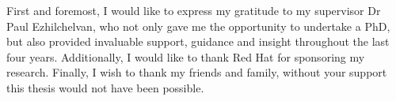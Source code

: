 
\begin{acknowledgements}      
First and foremost, I would like to express my gratitude to my supervisor Dr Paul Ezhilchelvan, who not only gave me the opportunity to undertake a PhD, but also provided invaluable support, guidance and insight throughout the last four years.  Additionally, I would like to thank Red Hat for sponsoring my research.  Finally, I wish to thank my friends and family, without your support this thesis would not have been possible.  
\end{acknowledgements}
